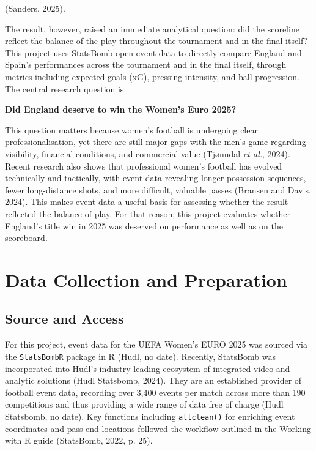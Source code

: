 \documentclass[
  11pt,
  a4paper,
  DIV=11,
  numbers=noendperiod]{scrartcl}
\begin{document}
(Sanders, 2025).

The result, however, raised an immediate analytical question: did the
scoreline reflect the balance of the play throughout the tournament and
in the final itself? This project uses StatsBomb open event data to
directly compare England and Spain's performances across the tournament
and in the final itself, through metrics including expected goals (xG),
pressing intensity, and ball progression. The central research question
is:

\textbf{Did England deserve to win the Women's Euro 2025?}

This question matters because women's football is undergoing clear
professionalisation, yet there are still major gaps with the men's game
regarding visibility, financial conditions, and commercial value
(Tjønndal \emph{et al.}, 2024). Recent research also shows that
professional women's football has evolved technically and tactically,
with event data revealing longer possession sequences, fewer
long-distance shots, and more difficult, valuable passes (Bransen and
Davis, 2024). This makes event data a useful basis for assessing whether
the result reflected the balance of play. For that reason, this project
evaluates whether England's title win in 2025 was deserved on
performance as well as on the scoreboard.

\section{Data Collection and
Preparation}\label{data-collection-and-preparation}

\subsection{Source and Access}\label{source-and-access}

For this project, event data for the UEFA Women's EURO 2025 was sourced
via the \texttt{StatsBombR} package in R (Hudl, no date). Recently,
StatsBomb was incorporated into Hudl's industry-leading ecosystem of
integrated video and analytic solutions (Hudl Statsbomb, 2024). They are
an established provider of football event data, recording over 3,400
events per match across more than 190 competitions and thus providing a
wide range of data free of charge (Hudl Statsbomb, no date). Key
functions including \texttt{allclean()} for enriching event coordinates
and pass end locations followed the workflow outlined in the Working
with R guide (StatsBomb, 2022, p. 25).
\end{document}
